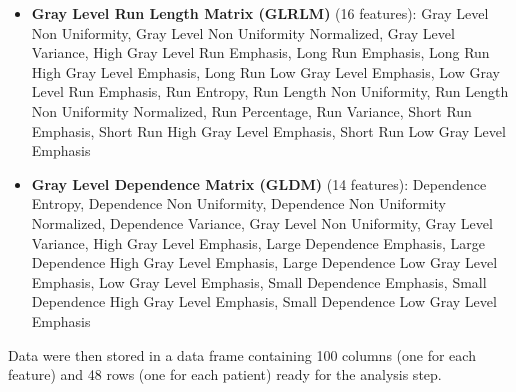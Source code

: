 \documentclass{standalone}
\begin{document}
\begin{itemize}
    \item \textbf{Gray Level Run Length Matrix (GLRLM)} (16 features): Gray Level Non Uniformity, Gray Level Non Uniformity Normalized, Gray Level Variance, High Gray Level Run Emphasis, Long Run Emphasis, Long Run High Gray Level Emphasis, Long Run Low Gray Level Emphasis, Low Gray Level Run Emphasis, Run Entropy, Run Length Non Uniformity, Run Length Non Uniformity Normalized, Run Percentage, Run Variance, Short Run Emphasis, Short Run High Gray Level Emphasis, Short Run Low Gray Level Emphasis
 
    \item \textbf{Gray Level Dependence Matrix (GLDM)} (14 features): Dependence Entropy, Dependence Non Uniformity, Dependence Non Uniformity Normalized, Dependence Variance, Gray Level Non Uniformity, Gray Level Variance, High Gray Level Emphasis, Large Dependence Emphasis, Large Dependence High Gray Level Emphasis, Large Dependence Low Gray Level Emphasis, Low Gray Level Emphasis, Small Dependence Emphasis, Small Dependence High Gray Level Emphasis, Small Dependence Low Gray Level Emphasis
\end{itemize}

Data were then stored in a data frame containing 100 columns (one for each feature) and 48 rows (one for each patient) ready for the analysis step.
\end{document}
